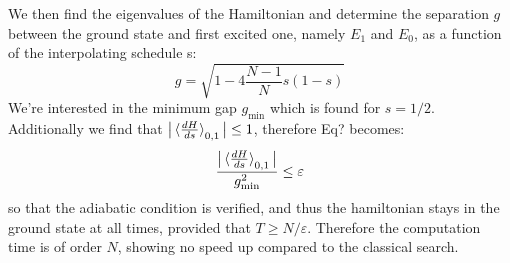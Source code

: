     We then find the eigenvalues of the Hamiltonian and determine the separation $g$ between the ground state and first excited one, namely $E_1$ and $E_0$, as a function of the interpolating schedule s:
    \begin{equation}
      g=\sqrt{1-4\frac{N-1}{N}s(1-s)}
      \label{separation}
    \end{equation}
    We're interested in the minimum gap $g_{\min}$ which is found for $s=1/2$. Additionally we find that $\big|\braket{\frac{dH}{ds}}_{0,1}\big| \leq 1$, therefore Eq? becomes:
    \begin{equation}
      \frac{\big|\braket{\frac{dH}{ds}}_{0,1}\big|}{g_{\min}^2} \leq \varepsilon
      \label{adiabatic_condition}
    \end{equation}
    so that the adiabatic condition is verified, and thus the hamiltonian stays in the ground state at all times, provided that $T\geq N/\varepsilon$. Therefore the computation time is of order $N$, showing no speed up compared to the classical search.

